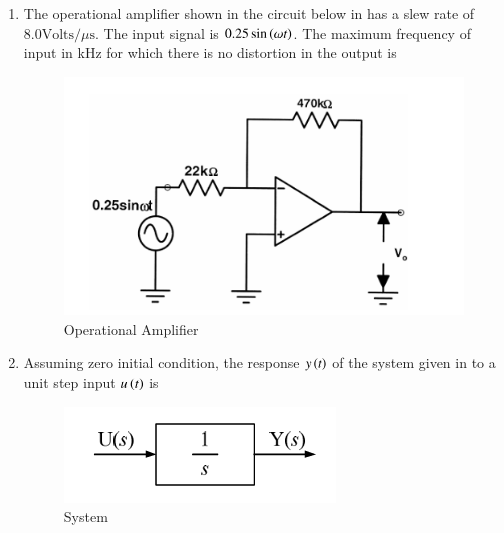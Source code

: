 \documentclass[journal,12pt,onecolumn]{IEEEtran}
\theoremstyle{remark}
\begin{document}
\begin{enumerate}
\item The operational amplifier shown in the circuit below in  has a slew rate of $8.0\text{Volts}/\mu\text{s}$. The input signal is $0.25 \sin \left( \omega t\right)$. The maximum frequency of input in kHz for which there is no distortion in the output is
\par \hfill{}
\begin{figure}[H]
\centering
\includegraphics[width=0.5\columnwidth]{Figs/Q-10.png}
\caption{Operational Amplifier}
\label{10}
\end{figure}
    \begin{enumerate}
    \end{enumerate}

\item Assuming zero initial condition, the response $y\left(t\right)$ of the system given in  to a unit step input $u\left(t\right)$ is
\par \hfill{}
\begin{figure}[H]
\centering
\includegraphics[width=0.2\columnwidth]{Figs/Q-11.png}
\caption{System}
\label{11}
\end{figure}
    \begin{enumerate}
    \end{enumerate}


\end{enumerate}
\end{document}
